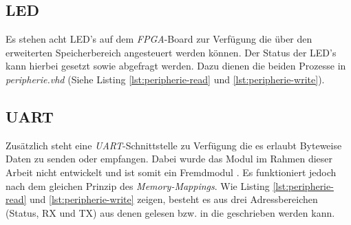         
        
        

        \subsection{LED}
            Es stehen acht LED's auf dem \textit{FPGA}-Board zur Verfügung die über den erweiterten Speicherbereich
            angesteuert werden können. Der Status der LED's kann hierbei gesetzt sowie abgefragt werden.
            Dazu dienen die beiden Prozesse in \textit{peripherie.vhd} (Siehe Listing \ref{lst:peripherie-read} und \ref{lst:peripherie-write}).

        \subsection{UART}
            Zusätzlich steht eine \textit{UART}-Schnittstelle zu Verfügung die es erlaubt Byteweise Daten
            zu senden oder empfangen.
            Dabei wurde das Modul im Rahmen dieser Arbeit nicht entwickelt und ist somit ein Fremdmodul \cite{vhdl-uart}.
            Es funktioniert jedoch nach dem gleichen Prinzip des \textit{Memory-Mappings}.
            Wie Listing \ref{lst:peripherie-read} und \ref{lst:peripherie-write} zeigen,
            besteht es aus drei Adressbereichen (Status, RX und TX) aus denen gelesen bzw. in die geschrieben werden kann.
            

